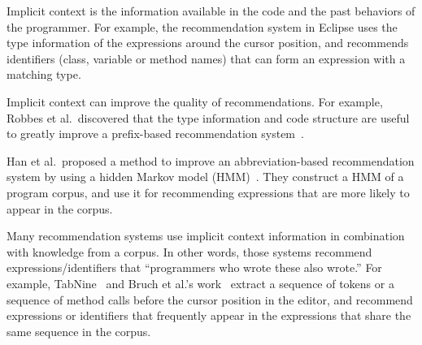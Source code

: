 \documentclass[PRO,english]{ipsj}
\begin{document}
Implicit context is the information available in the code and the past behaviors of the programmer.  For example, the recommendation system in Eclipse uses the type information of the expressions around the cursor position, and recommends identifiers (class, variable or method  names) that can form an expression with a matching type.

Implicit context can improve the quality of recommendations.  For example, Robbes et al.\  discovered that the type information and code structure are useful to greatly improve a prefix-based recommendation system~\cite{robbes2008program}.

Han et al.\ proposed a method to improve an abbreviation-based recommendation system by using a hidden Markov model (HMM)~\cite{han2009code}.  They construct a HMM of a program corpus, and use it for recommending expressions that are more likely to appear in the corpus.






Many recommendation systems use implicit context information in combination with knowledge from a corpus.  In other words, those systems recommend expressions/identifiers that ``programmers who wrote these also wrote.'' 
For example, TabNine~\cite{deep-tabnine2019} and Bruch et al.'s work~\cite{bruch2009learning} extract a sequence of tokens or a sequence of method calls before the cursor position in the editor, and recommend expressions or identifiers that frequently appear in the expressions that share the same sequence in the corpus.  %
\end{document}
